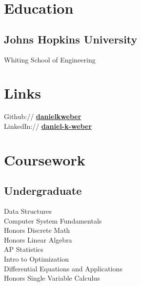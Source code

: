 \documentclass[]{deedy-resume-openfont}
\begin{document}
%
%
\lastupdated

%
%

%
%

\begin{minipage}[t]{0.33\textwidth} 


\section{Education} 

\subsection{Johns Hopkins University}

Whiting School of Engineering

\sectionsep



\section{Links} 
Github:// \href{https://github.com/Danielkweber}{\bf danielkweber} \\
LinkedIn://  \href{https://www.linkedin.com/in/daniel-k-weber/}{\bf daniel-k-weber} \\


\section{Coursework}

\subsection{Undergraduate}
Data Structures \\
Computer System Fundamentals \\
Honors Discrete Math \\
Honors Linear Algebra \\
AP Statistics \\
Intro to Optimization \\
Differential Equations and Applications \\
Honors Single Variable Calculus \\



\end{minipage}
\end{document}
